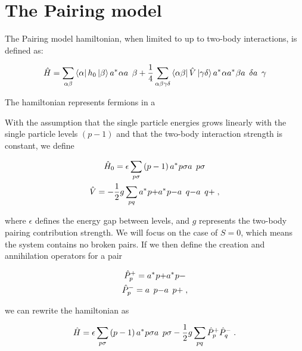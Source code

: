 \section{The Pairing model}

The Pairing model hamiltonian, when limited to up to two-body interactions, is defined as:

\begin{equation}
  \hat{H} = \sum_{\alpha\beta} \bra{\alpha}h_0\ket{\beta}\hc{a}{\alpha}\op{a}{\beta} + \frac{1}{4} \sum_{\alpha\beta\gamma\delta} \bra{\alpha\beta}\hat{V}\ket{\gamma\delta} \hc{a}{\alpha}\hc{a}{\beta}\op{a}{\delta}\op{a}{\gamma}
  \label{eq:Pairing_model_imp}
\end{equation}

The hamiltonian represents fermions in a 

With the assumption that the single particle energies grows linearly with the single particle levels $(p - 1)$ and that the two-body interaction strength is constant, we define

\begin{equation}
  \begin{gathered}
    \hat{H}_0 = \epsilon \sum_{p\sigma} \left(p - 1\right) \hc{a}{p\sigma} \op{a}{p\sigma} \\
    \hat{V} = -\frac{1}{2}g\sum_{pq} \hc{a}{p+}\hc{a}{p-}\op{a}{q-}\op{a}{q+} \; ,
  \end{gathered}
  \label{eq:sub_hamiltonian_pairing_imp}
\end{equation}

where $\epsilon$ defines the energy gap between levels, and $g$ represents the two-body pairing contribution strength. We will focus on the case of $S=0$, which means the system contains no broken pairs. If we then define the creation and annihilation operators for a pair

\begin{equation*}
  \begin{gathered}
    \hat{P}_p^+ = \hc{a}{p+}\hc{a}{p-}\\
    \hat{P}_p^- = \op{a}{p-}\op{a}{p+} \; ,
  \end{gathered}
\end{equation*}

we can rewrite the hamiltonian as

\begin{equation}
  \hat{H} = \epsilon \sum_{p\sigma} \left(p-1\right)\hc{a}{p\sigma}\op{a}{p\sigma} - \frac{1}{2}g\sum_{pq}\hat{P}_p^+\hat{P}_q^- \; .
  \label{eq:Pairing_model_final}
\end{equation}

